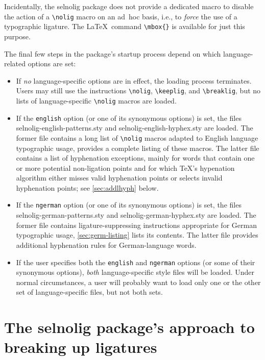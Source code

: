 \documentclass[12pt]{article}
\newcommand{\pkg}[1]{\textsf{#1}}
\newcommand{\opt}[1]{\texttt{#1}}
\newcommand{\cmmd}[1]{\texttt{\textbackslash #1}}
\begin{document}
Incidentally, the \pkg{selnolig} package does not provide a dedicated macro to disable the action of a \cmmd{nolig} macro on an ad~hoc basis, i.e., to \emph{force} the use of a typographic ligature. The \LaTeX\ command \Verb+\mbox{}+ is available for just this purpose.


The final few steps in the package's startup process depend on which language-related options are set:
\begin{itemize}
\item If \emph{no} language-specific options are in effect, the loading process terminates. Users may still use the instructions \cmmd{nolig}, \cmmd{keeplig}, and \cmmd{breaklig}, but no lists of language-specific \cmmd{nolig} macros are loaded.

\item If the \opt{english} option (or one of its synonymous options) is set, the files \pkg{selnolig-english-patterns.sty} and \pkg{selnolig-english-hyphex.sty} are loaded. The former file contains a long list of \cmmd{nolig} macros adapted to English language typographic usage,  provides a complete listing of these macros. The latter file contains a list of hyphenation exceptions, mainly for words that contain one or more potential non-ligation points and for which \TeX's hypenation algorithm either misses valid hyphenation points or selects invalid hyphenation points; see \cref{sec:addlhyph} below.

\item If the \opt{ngerman} option (or one of its synonymous options) is set, the files \pkg{selnolig-german-patterns.sty} and \pkg{selnolig-german-hyphex.sty} are loaded. The former file contains ligature-suppressing instructions appropriate for German typographic usage, \cref{sec:germ-listing} lists its contents. The latter file provides additional hyphenation rules for German-language words.

\item If the user specifies both the \opt{english} and \opt{ngerman} options (or some of their synonymous options), \emph{both} language-specific style files will be loaded. Under normal circumstances, a user will probably want to load only one or the other set of language-specific files, but not both sets.
\end{itemize}



\section[The selnolig package's approach to breaking up ligatures]{The \pkg{selnolig} package's approach to breaking up ligatures}
\end{document}

